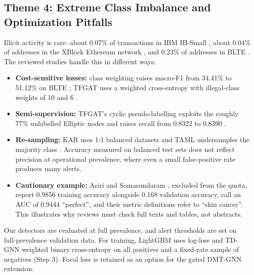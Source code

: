 \documentclass[11pt,a4paper]{article}
\begin{document}
\subsection{Theme 4: Extreme Class Imbalance and Optimization Pitfalls}
Illicit activity is rare: about 0.07\% of transactions in IBM HI-Small \cite{egressy2024multigraph}, about 0.04\% of addresses in the XBlock Ethereum network \cite{tian2025kar}, and 0.23\% of addresses in BLTE \cite{alemari2026explainable}. The reviewed studies handle this in different ways:
\begin{itemize}[leftmargin=*]
    \item \textbf{Cost-sensitive losses:} class weighting raises macro-F1 from 34.41\% to 51.12\% on BLTE \cite{alemari2026explainable}; TFGAT uses a weighted cross-entropy with illegal-class weights of 10 and 6 \cite{li2025tfgat}.
    \item \textbf{Semi-supervision:} TFGAT's cyclic pseudo-labelling exploits the roughly 77\% unlabelled Elliptic nodes and raises recall from 0.8322 to 0.8390 \cite{li2025tfgat}.
    \item \textbf{Re-sampling:} KAR uses 1:1 balanced datasets \cite{tian2025kar} and TAML undersamples the majority class \cite{rico2026taml}. Accuracy measured on balanced test sets does not reflect precision at operational prevalence, where even a small false-positive rate produces many alerts.
    \item \textbf{Cautionary example:} Asiri and Somasundaram \cite{asiri2025gcn}, excluded from the quota, report 0.9856 training accuracy alongside 0.168 validation accuracy, call an AUC of 0.9444 ``perfect'', and their metric definitions refer to ``skin cancer''. This illustrates why reviews must check full texts and tables, not abstracts.
\end{itemize}

Our detectors are evaluated at full prevalence, and alert thresholds are set on full-prevalence validation data. For training, LightGBM uses log-loss and TD-GNN weighted binary cross-entropy on all positives and a fixed-rate sample of negatives (Step 3). Focal loss \cite{lin2017focal} is retained as an option for the gated DMT-GNN extension.
\end{document}
